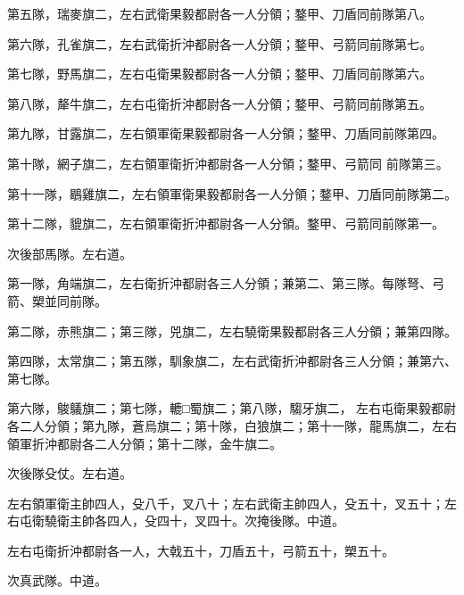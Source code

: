 \begin{pinyinscope}
 第五隊，瑞麥旗二，左右武衛果毅都尉各一人分領；鍪甲、刀盾同前隊第八。



 第六隊，孔雀旗二，左右武衛折沖都尉各一人分領；鍪甲、弓箭同前隊第七。



 第七隊，野馬旗二，左右屯衛果毅都尉各一人分領；鍪甲、刀盾同前隊第六。



 第八隊，犛牛旗二，左右屯衛折沖都尉各一人分領；鍪甲、弓箭同前隊第五。



 第九隊，甘露旗二，左右領軍衛果毅都尉各一人分領；鍪甲、刀盾同前隊第四。



 第十隊，網子旗二，左右領軍衛折沖都尉各一人分領；鍪甲、弓箭同
 前隊第三。



 第十一隊，鶡雞旗二，左右領軍衛果毅都尉各一人分領；鍪甲、刀盾同前隊第二。



 第十二隊，貔旗二，左右領軍衛折沖都尉各一人分領。鍪甲、弓箭同前隊第一。



 次後部馬隊。左右道。



 第一隊，角端旗二，左右衛折沖都尉各三人分領；兼第二、第三隊。每隊弩、弓箭、槊並同前隊。



 第二隊，赤熊旗二；第三隊，兕旗二，左右驍衛果毅都尉各三人分領；兼第四隊。



 第四隊，太常旗二；第五隊，馴象旗二，左右武衛折沖都尉各三人分領；兼第六、第七隊。



 第六隊，鵔鸃旗二；第七隊，轆□蜀旗二；第八隊，騶牙旗二，
 左右屯衛果毅都尉各二人分領；第九隊，蒼烏旗二；第十隊，白狼旗二；第十一隊，龍馬旗二，左右領軍折沖都尉各二人分領；第十二隊，金牛旗二。



 次後隊殳仗。左右道。



 左右領軍衛主帥四人，殳八千，叉八十；左右武衛主帥四人，殳五十，叉五十；左右屯衛驍衛主帥各四人，殳四十，叉四十。次掩後隊。中道。



 左右屯衛折沖都尉各一人，大戟五十，刀盾五十，弓箭五十，槊五十。



 次真武隊。中道。




\end{pinyinscope}

